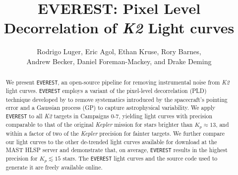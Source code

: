\documentclass[]{emulateapj}
\begin{document}
\title{EVEREST: Pixel Level Decorrelation of \emph{K2} Light curves}

\author{Rodrigo Luger, Eric Agol, Ethan Kruse, Rory Barnes,\\
Andrew Becker, Daniel Foreman-Mackey, and Drake Deming}

\begin{abstract}
We present \texttt{EVEREST}, an open-source pipeline for removing instrumental noise
from \emph{K2} light curves. \texttt{EVEREST} employs a variant of the pixel-level decorrelation (PLD)
technique developed by \cite{DEM15} to remove systematics introduced by the spacecraft's 
pointing error and a Gaussian process (GP) to capture astrophysical variability. We
apply \texttt{EVEREST} to all \emph{K2} targets in Campaigns 0-7, yielding light curves
with precision comparable to that of the original \emph{Kepler} mission for stars brighter
than $K_p \approx 13$, and within a factor of two of the \emph{Kepler} precision for fainter
targets. We further compare our light curves to the other de-trended light curves available
for download at the MAST HLSP server and demonstrate that, on average, \texttt{EVEREST} results 
in the highest precision for $K_p \lesssim 15$ stars. The \texttt{EVEREST} light curves and the source code
used to generate it are freely available online.
\end{abstract}
\end{document}
